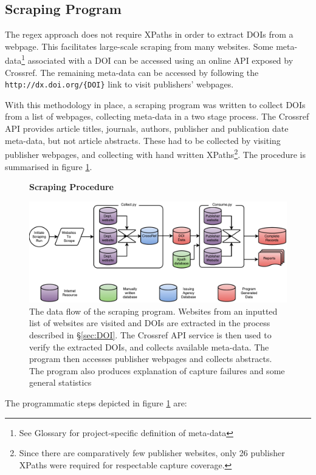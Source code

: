 \subsection{Scraping Program}
\label{sec:SCRAPING_PROGRAM}
The regex approach does not require XPaths in order to extract DOIs from a webpage. This facilitates large-scale scraping from many websites. Some meta-data\footnote{See Glossary for project-specific definition of meta-data} associated with a DOI can be accessed using an online API exposed by Crossref. The remaining meta-data can be accessed by following the \texttt{http://dx.doi.org/\{DOI\}} link to visit publishers' webpages.

With this methodology in place, a scraping program was written to collect DOIs from a list of webpages, collecting meta-data in a two stage process. The Crossref API provides article titles, journals, authors, publisher and publication date meta-data, but not article abstracts. These had to be collected by visiting publisher webpages, and collecting with hand written XPaths\footnote{Since there are comparatively few publisher websites, only 26 publisher XPaths were required for respectable capture coverage.}. The procedure is summarised in figure \ref{fig:Cherry}.
\begin{figure}[H]
    \centering
    \textbf{Scraping Procedure}\par\medskip
    \includegraphics[width=\textwidth]{Data_Acquisition/Cherry2.pdf}
    \caption[Data Flow in Scraping Procedure]{The data flow of the scraping program. Websites from an inputted list of websites are visited and DOIs are extracted in the process described in  \S\ref{sec:DOI}. The Crossref API service is then used to verify the extracted DOIs, and collects available meta-data. The program then accesses publisher webpages and collects abstracts. The program also produces explanation of capture failures and some general statistics}
\label{fig:Cherry}
\end{figure}
The programmatic steps depicted in figure \ref{fig:Cherry} are:
